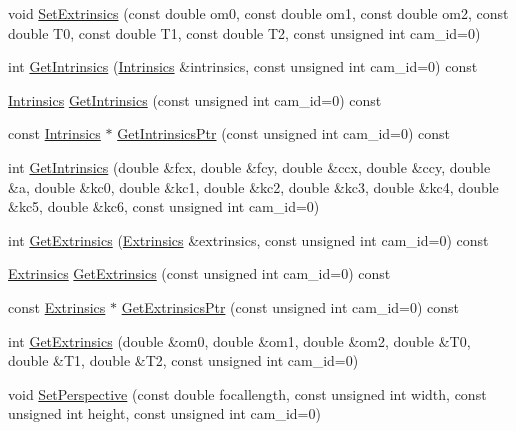 \begin{DoxyCompactItemize}
\item 
void \hyperlink{classsvl_sample_camera_geometry_aaf76200111c3e78b6b8ad3593d0abcbe}{Set\+Extrinsics} (const double om0, const double om1, const double om2, const double T0, const double T1, const double T2, const unsigned int cam\+\_\+id=0)
\item 
int \hyperlink{classsvl_sample_camera_geometry_a0605f6149bc673ddda2fdff62e18fb52}{Get\+Intrinsics} (\hyperlink{structsvl_sample_camera_geometry_1_1_intrinsics}{Intrinsics} \&intrinsics, const unsigned int cam\+\_\+id=0) const 
\item 
\hyperlink{structsvl_sample_camera_geometry_1_1_intrinsics}{Intrinsics} \hyperlink{classsvl_sample_camera_geometry_a25b5b31b9ce6662f5de3ed000e52d3a2}{Get\+Intrinsics} (const unsigned int cam\+\_\+id=0) const 
\item 
const \hyperlink{structsvl_sample_camera_geometry_1_1_intrinsics}{Intrinsics} $\ast$ \hyperlink{classsvl_sample_camera_geometry_a8f535e5d368211f7e6e2e038acf7dcba}{Get\+Intrinsics\+Ptr} (const unsigned int cam\+\_\+id=0) const 
\item 
int \hyperlink{classsvl_sample_camera_geometry_a9a989dee923b87befa750a247134170a}{Get\+Intrinsics} (double \&fcx, double \&fcy, double \&ccx, double \&ccy, double \&a, double \&kc0, double \&kc1, double \&kc2, double \&kc3, double \&kc4, double \&kc5, double \&kc6, const unsigned int cam\+\_\+id=0)
\item 
int \hyperlink{classsvl_sample_camera_geometry_afaa5b9430fedd4e6a2a64096384b1246}{Get\+Extrinsics} (\hyperlink{structsvl_sample_camera_geometry_1_1_extrinsics}{Extrinsics} \&extrinsics, const unsigned int cam\+\_\+id=0) const 
\item 
\hyperlink{structsvl_sample_camera_geometry_1_1_extrinsics}{Extrinsics} \hyperlink{classsvl_sample_camera_geometry_a11d0dbf26b9e178040ae525f3245757f}{Get\+Extrinsics} (const unsigned int cam\+\_\+id=0) const 
\item 
const \hyperlink{structsvl_sample_camera_geometry_1_1_extrinsics}{Extrinsics} $\ast$ \hyperlink{classsvl_sample_camera_geometry_a9a1b78d25fb357c1aa2f19975077fd1e}{Get\+Extrinsics\+Ptr} (const unsigned int cam\+\_\+id=0) const 
\item 
int \hyperlink{classsvl_sample_camera_geometry_a7a0a0c3797c0736cc0747ec3e0726325}{Get\+Extrinsics} (double \&om0, double \&om1, double \&om2, double \&T0, double \&T1, double \&T2, const unsigned int cam\+\_\+id=0)
\item 
void \hyperlink{classsvl_sample_camera_geometry_a34028d18bb53dc980e32b7069c591ee2}{Set\+Perspective} (const double focallength, const unsigned int width, const unsigned int height, const unsigned int cam\+\_\+id=0)

\end{DoxyCompactItemize}
